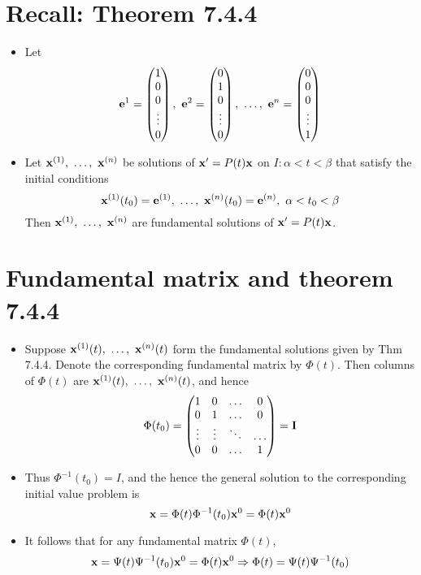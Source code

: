 \documentclass[11pt,a4paper]{article}
\begin{document}
	\section*{Recall: Theorem 7.4.4}
	\begin{itemize}
		\item Let
		$$
		\vb{e}^{1} =
		\begin{pmatrix}
			1\\
			0\\
			0\\
			\vdots \\
			0
		\end{pmatrix},\ 
		\vb{e}^{2} =
		\begin{pmatrix}
			0\\
			1\\
			0\\
			\vdots \\
			0
		\end{pmatrix},\ \ldots,\ 
		\vb{e}^{n} =
		\begin{pmatrix}
			0\\
			0\\
			0\\
			\vdots \\
			1
		\end{pmatrix}
		$$
		\item Let $\vb{x}^{(1)},\ \ldots,\  \vb{x}^{(n)}$ be solutions of $\vb{x}^\prime = P(t)\vb{x}$ on $I: \alpha < t < \beta$ that satisfy the initial conditions
		$$
		\vb{x}^{(1)}(t_0) = \vb{e}^{(1)},\ \ldots,\ \vb{x}^{(n)}(t_0) = \vb{e}^{(n)},\ \alpha<t_0<\beta
		$$
		Then $\vb{x}^{(1)},\ \ldots,\ \vb{x}^{(n)}$ are fundamental solutions of $\vb{x}^\prime = P(t)\vb{x}$.
	\end{itemize}
	\section*{Fundamental matrix and theorem 7.4.4}
	\begin{itemize}
		\item Suppose $\vb{x}^{(1)}(t),\ \ldots,\ \vb{x}^{(n)}(t)$ form the fundamental solutions given by Thm 7.4.4. Denote the corresponding fundamental matrix by $\Phi(t)$. Then columns of $\Phi(t)$ are $\vb{x}^{(1)}(t),\ \ldots,\ \vb{x}^{(n)}(t)$, and hence
		$$
		\Phi(t_0) = 
		\begin{pmatrix}
			1 & 0 & \ldots & 0\\
			0 & 1 & \ldots & 0\\
			\vdots & \vdots & \ddots & \ldots\\
			0 & 0 & \ldots & 1
		\end{pmatrix} = \vb{I}
		$$
		\item Thus $\Phi^{-1}(t_0) = I$, and the hence the general solution to the corresponding initial value problem is
		$$
		\vb{x} = \Phi(t)\Phi^{-1}(t_0)\vb{x}^0 = \Phi(t)\vb{x}^0
		$$
		\item It follows that for any fundamental matrix $\Phi(t)$,
		$$
		\vb{x} = \Psi(t)\Psi^{-1}(t_0)\vb{x}^0 = \Phi(t)\vb{x}^0\Rightarrow \Phi(t) = \Psi(t)\Psi^{-1}(t_0)
		$$
	\end{itemize}
\end{document}
